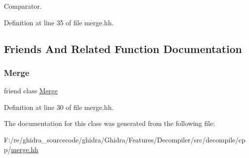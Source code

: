 Comparator. 



Definition at line 35 of file merge.\+hh.



\subsection{Friends And Related Function Documentation}
\mbox{\label{class_high_edge_ada039d79291c7baead36ca12c2f1737b}} 
\subsubsection{\texorpdfstring{Merge}{Merge}}
{\footnotesize\ttfamily friend class \mbox{\hyperlink{class_merge}{Merge}}\hspace{0.3cm}{\ttfamily [friend]}}



Definition at line 30 of file merge.\+hh.



The documentation for this class was generated from the following file\+:\begin{DoxyCompactItemize}
\item 
F\+:/re/ghidra\+\_\+sourcecode/ghidra/\+Ghidra/\+Features/\+Decompiler/src/decompile/cpp/\mbox{\hyperlink{merge_8hh}{merge.\+hh}}\end{DoxyCompactItemize}
